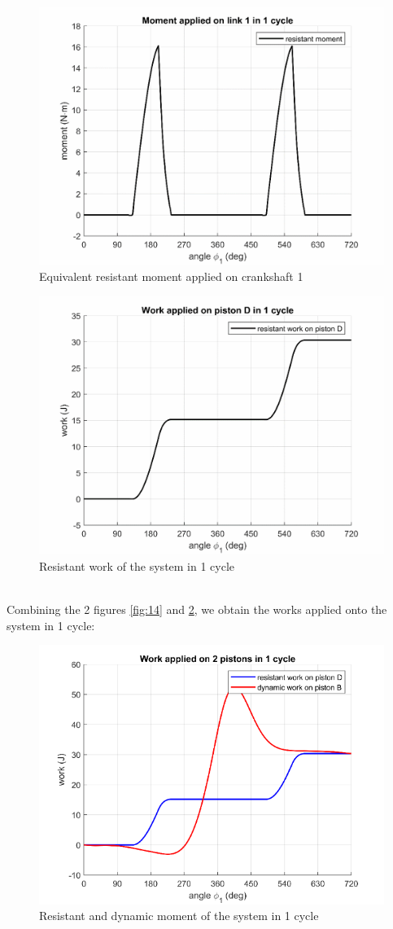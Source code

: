 \begin{figure}[h]
	\centering
	\includegraphics[width=0.66\linewidth]{16}
	\caption{Equivalent resistant moment applied on crankshaft 1}
	\label{fig:16}
\end{figure}
\begin{figure}[h]
	\centering
	\includegraphics[width=0.66\linewidth]{17}
	\caption{Resistant work of the system in 1 cycle}
	\label{fig:17}
\end{figure}\\
Combining the 2 figures \ref{fig:14} and \ref{fig:17}, we obtain the works applied onto the system in 1 cycle:
\begin{figure}
	\centering
	\includegraphics[width=0.6\linewidth]{18}
	\caption{Resistant and dynamic moment of the system in 1 cycle}
	\label{fig:18}
\end{figure}
